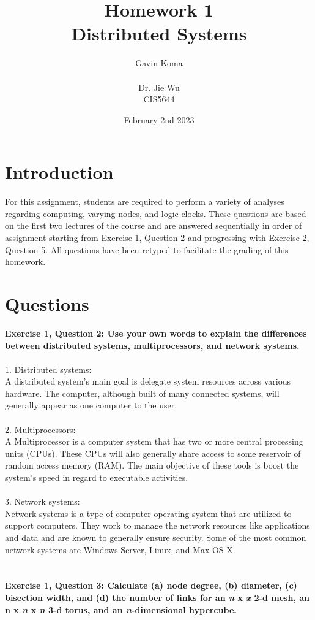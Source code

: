 \documentclass{article}
\title{Homework 1 \\ Distributed Systems}
\author{Gavin Koma \\ \\ Dr. Jie Wu \\ CIS5644}
\date{February 2nd 2023}
\begin{document}
\maketitle

\newpage
\section{Introduction}
For this assignment, students are required to perform a variety of analyses regarding computing, varying nodes, and logic clocks. These questions are based on the first two lectures of the course and are answered sequentially in order of assignment starting from Exercise 1, Question 2 and progressing with Exercise 2, Question 5. All questions have been retyped to facilitate the grading of this homework. 

\section{Questions}
\textbf{Exercise 1, Question 2: Use your own words to explain the differences between distributed systems, multiprocessors, and network systems.}
\\ \\
1. Distributed systems: \\
A distributed system's main goal is delegate system resources across various hardware. The computer, although built of many connected systems, will generally appear as one computer to the user. 
\\ \\
2. Multiprocessors:\\
A Multiprocessor is a computer system that has two or more central processing units (CPUs). These CPUs will also generally share access to some reservoir of random access memory (RAM). The main objective of these tools is boost the system's speed in regard to executable activities. 
\\ \\
3. Network systems:\\
Network systems is a type of computer operating system that are utilized to support computers. They work to manage the network resources like applications and data and are known to generally ensure security. Some of the most common network systems are Windows Server, Linux, and Max OS X.
\\ \\ \\
\textbf{Exercise 1, Question 3: Calculate (a) node degree, (b) diameter, (c) bisection width, and (d) the number of links for an \textit{n} x \textit{x} 2-d mesh, an n x \textit{n} x \textit{n} 3-d torus, and an \textit{n}-dimensional hypercube.}\\ \\
\end{document}
